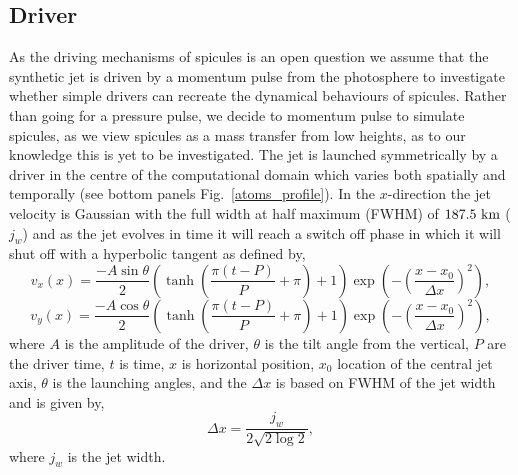 \documentclass[12pt]{ociamthesis}
\begin{document}
\subsection{Driver}
\label{subsec:driver}
As the driving mechanisms of spicules is an open question we assume that the synthetic jet is driven by a momentum pulse from the photosphere to investigate whether simple drivers can recreate the dynamical behaviours of spicules. Rather than going for a pressure pulse, we decide to momentum pulse to simulate spicules, as we view spicules as a mass transfer from low heights, as to our knowledge this is yet to be investigated. The jet is launched symmetrically by a driver in the centre of the computational domain which varies both spatially and temporally (see bottom panels Fig.~\ref{atoms_profile}). In the $x$-direction the jet velocity is Gaussian with the full width at half maximum (FWHM) of $187.5~\rm{km}$ ($j_w$) and as the jet evolves in time it will reach a switch off phase in which it will shut off with a hyperbolic tangent as defined by,
\begin{equation}
    v_x(x) = \frac{-A\sin{\theta}}{2}\left( \tanh{\left( \frac{\pi (t-P)}{P}+ \pi \right) +1 } \right) \exp \left( - \left(\frac{x-x_0}{\Delta x} \right)^2  \right),
\end{equation}
\begin{equation}
    v_y(x) = \frac{-A\cos{\theta}}{2}\left( \tanh{\left( \frac{\pi (t-P)}{P}+ \pi \right) +1 } \right) \exp \left( - \left(\frac{x-x_0}{\Delta x} \right)^2  \right),
\end{equation}
where $A$ is the amplitude of the driver, $\theta$ is the tilt angle from the vertical, $P$ are the driver time, $t$ is time, $x$ is horizontal position, $x_0$ location of the central jet axis, $\theta$ is the launching angles, and the $\Delta x$ is based on FWHM of the jet width and is given by,
\begin{equation}
\Delta x = \dfrac{j_w}{2 \sqrt{2 \log{2}}},
\end{equation}
where $j_w$ is the jet width.


  
\end{document}
